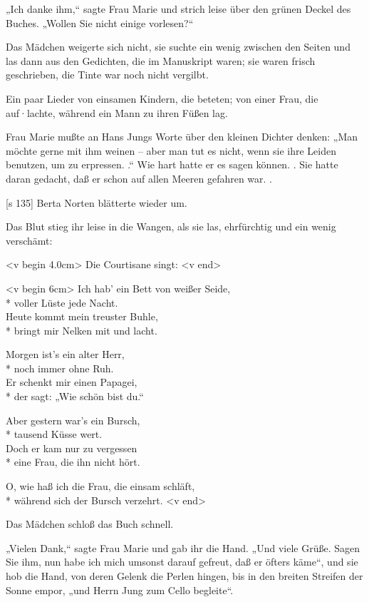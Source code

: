 „Ich danke ihm,“ sagte Frau Marie und strich
leise über den grünen Deckel des Buches. „Wollen
Sie nicht einige vorlesen?“

Das Mädchen weigerte sich nicht, sie suchte ein
wenig zwischen den Seiten und las dann aus den
Gedichten, die im Manuskript waren; sie waren frisch
geschrieben, die Tinte war noch nicht vergilbt.

Ein paar Lieder von einsamen Kindern, die
beteten; von einer Frau, die auf·lachte, während ein
Mann zu ihren Füßen lag.

Frau Marie mußte an Hans Jungs Worte über
den kleinen Dichter denken: „Man möchte gerne
mit ihm weinen – aber man tut es nicht, wenn
sie ihre Leiden benutzen, um zu erpressen. .“ Wie
hart hatte er es sagen können. . Sie hatte daran
gedacht, daß er schon auf allen Meeren gefahren war. .

[s 135]
Berta Norten blätterte wieder um.

Das Blut stieg ihr leise in die Wangen, als sie
las, ehrfürchtig und ein wenig verschämt:

<v begin 4.0cm>
Die Courtisane singt:
<v end>

<v begin 6cm>
Ich hab' ein Bett von weißer Seide,\\*
voller Lüste jede Nacht.\\
Heute kommt mein treuster Buhle,\\*
bringt mir Nelken mit und lacht.

Morgen ist's ein alter Herr,\\*
noch immer ohne Ruh.\\
Er schenkt mir einen Papagei,\\*
der sagt: „Wie schön bist du.“

Aber gestern war's ein Bursch,\\*
tausend Küsse wert.\\
Doch er kam nur zu vergessen\\*
eine Frau, die ihn nicht hört.

O, wie haß ich die Frau, die einsam schläft,\\*
während sich der Bursch verzehrt.
<v end>

Das Mädchen schloß das Buch schnell.

„Vielen Dank,“ sagte Frau Marie und gab ihr
die Hand. „Und viele Grüße. Sagen Sie ihm,
nun habe ich mich umsonst darauf gefreut, daß er
öfters käme“, und sie hob die Hand, von deren Gelenk
die Perlen hingen, bis in den breiten Streifen der
Sonne empor, „und Herrn Jung zum Cello begleite“.

